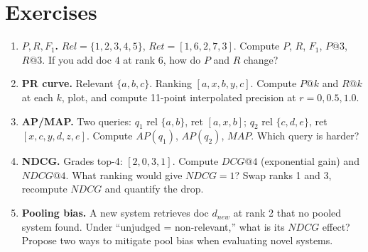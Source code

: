 \section{Exercises}
\begin{enumerate}[label=E5.\arabic*, leftmargin=*, itemsep=0.6em]
  \item \textbf{$P,R,F_1$.} $Rel=\{1,2,3,4,5\}$, $Ret=[1,6,2,7,3]$. Compute $P$, $R$, $F_1$, $P@3$, $R@3$. If you add doc $4$ at rank 6, how do $P$ and $R$ change?
  \item \textbf{PR curve.} Relevant $\{a,b,c\}$. Ranking $[a,x,b,y,c]$. Compute $P@k$ and $R@k$ at each $k$, plot, and compute 11-point interpolated precision at $r=0,0.5,1.0$.
  \item \textbf{AP/MAP.} Two queries: $q_1$ rel $\{a,b\}$, ret $[a,x,b]$; $q_2$ rel $\{c,d,e\}$, ret $[x,c,y,d,z,e]$. Compute $AP(q_1)$, $AP(q_2)$, $MAP$. Which query is harder?
  \item \textbf{NDCG.} Grades top-4: $[2,0,3,1]$. Compute $DCG@4$ (exponential gain) and $NDCG@4$. What ranking would give $NDCG=1$? Swap ranks 1 and 3, recompute $NDCG$ and quantify the drop.
  \item \textbf{Pooling bias.} A new system retrieves doc $d_{new}$ at rank 2 that no pooled system found. Under ``unjudged = non-relevant,'' what is its $NDCG$ effect? Propose two ways to mitigate pool bias when evaluating novel systems.
\end{enumerate}

